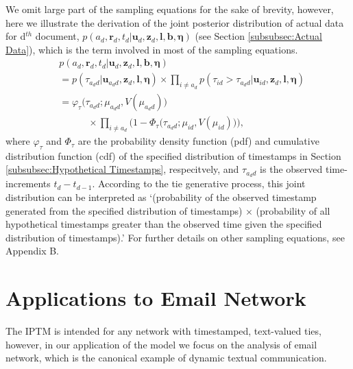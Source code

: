\documentclass[twoside]{article}
\begin{document}
   We omit large part of the sampling equations for the sake of brevity, however, here we illustrate the derivation of the joint posterior distribution of actual data for d$^{th}$ document, $p(a_d, \boldsymbol{r}_d, t_d|\boldsymbol{u}_{d}, \boldsymbol{z}_d,\boldsymbol{l}, \boldsymbol{b}, \boldsymbol{\eta})$ (see Section \ref{subsubsec:Actual Data}), which is the term involved in most of the sampling equations. 
  \begin{equation*}
  \begin{aligned}
  &p(a_d, \boldsymbol{r}_d, t_d|\boldsymbol{u}_{d}, \boldsymbol{z}_d,\boldsymbol{l}, \boldsymbol{b}, \boldsymbol{\eta}) \\&= p(\tau_{a_d d}|\boldsymbol{u}_{a_dd},\boldsymbol{z}_d,\boldsymbol{l}, \boldsymbol{\eta})\times \prod_{i\neq a_d} p(\tau_{id} >\tau_{a_d d}|\boldsymbol{u}_{id},\boldsymbol{z}_d,\boldsymbol{l}, \boldsymbol{\eta}) \\& 
  = \varphi_{\tau}\big(\tau_{a_d d}; \mu_{a_d d}, V(\mu_{a_d d})\big)\\&\quad\quad\quad \times  \prod_{i\neq a_d}\Big(1-\Phi_{\tau} \big(\tau_{a_d d}; \mu_{i d}, V(\mu_{i d})\big) \Big),
  \end{aligned}
    \label{eqn:tieposterior}
\end{equation*}  
  where $\varphi_\tau$ and $\Phi_\tau$ are the probability density function (pdf) and cumulative distribution function (cdf) of the specified distribution of timestamps in Section \ref{subsubsec:Hypothetical Timestamps}, respecitvely, and $\tau_{a_d d}$ is the observed time-increments $t_d - t_{d-1}$. According to the tie generative process, this joint distribution can be interpreted as `(probability of the observed timestamp generated from the specified distribution of timestamps) $\times$ (probability of all hypothetical timestamps greater than the observed time given the specified distribution of timestamps).' For further details on other sampling equations, see Appendix B.

\section{Applications to Email Network}\label{sec:Application}
The IPTM is intended for any network with timestamped, text-valued ties, however, in our application of the model we focus on the analysis of email network, which is the canonical example of dynamic textual communication. 
\end{document}
